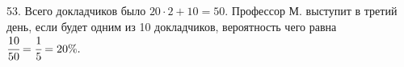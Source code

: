 53. Всего докладчиков было $20\cdot2+10=50.$ Профессор М. выступит в третий день, если будет одним из 10 докладчиков, вероятность чего равна $\cfrac{10}{50}=\cfrac{1}{5}=20\%.$\\
